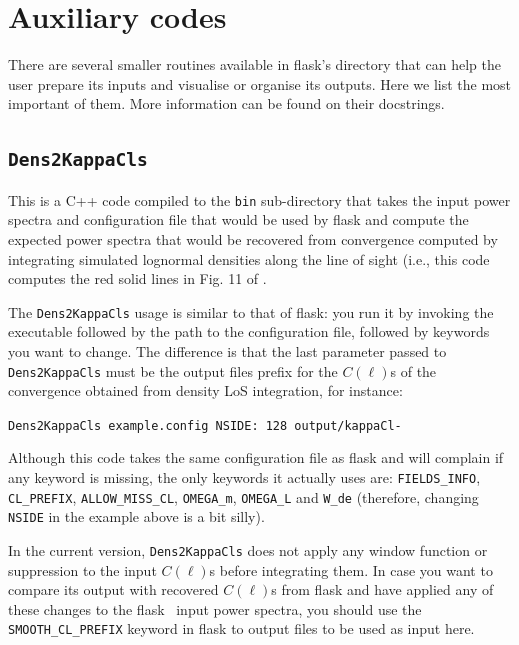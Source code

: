 \documentclass[12pt]{book} %
\begin{document}
\section{Auxiliary codes}
\label{sec:aux} 

There are several smaller routines available in {\sc flask}'s directory that can help the user prepare 
its inputs and visualise or organise its outputs. Here we list the most important of them. More information 
can be found on their docstrings. 

\subsection{{\tt Dens2KappaCls}}
\label{sec:dens2kappacls}

This is a C++ code compiled to the {\tt bin} sub-directory that takes the input power spectra and 
configuration file that would be used by {\sc flask} and compute the expected power spectra that 
would be recovered from convergence computed by integrating simulated lognormal densities along 
the line of sight (i.e., this code computes the red solid lines in Fig. 11 of \citet{Xavier16mn}. 

The {\tt Dens2KappaCls} usage is similar to that of {\sc flask}: you run it by invoking the 
executable followed by the path to the configuration file, followed by keywords you want to 
change. The difference is that the last parameter passed to {\tt Dens2KappaCls} must be the 
output files prefix for the $C(\ell)$s of the convergence obtained from density LoS integration, 
for instance:

\noindent
{\tt Dens2KappaCls example.config NSIDE: 128 output/kappaCl-}

Although this code takes the same configuration file as {\sc flask} and will complain if any 
keyword is missing, the only keywords it actually uses are: {\tt FIELDS\_INFO}, 
{\tt CL\_PREFIX}, {\tt ALLOW\_MISS\_CL}, {\tt OMEGA\_m}, {\tt OMEGA\_L} and 
{\tt W\_de} (therefore, changing {\tt NSIDE} in the example 
above is a bit silly).

In the current version, {\tt Dens2KappaCls} does not apply any window function or suppression 
to the input $C(\ell)$s before integrating them. In case you want to compare its output with 
recovered $C(\ell)$s from {\sc flask} and have applied any of these changes to the {\sc flask} \
input power spectra, you should use the {\tt SMOOTH\_CL\_PREFIX} keyword in {\sc flask} to 
output files to be used as input here.
\end{document}
